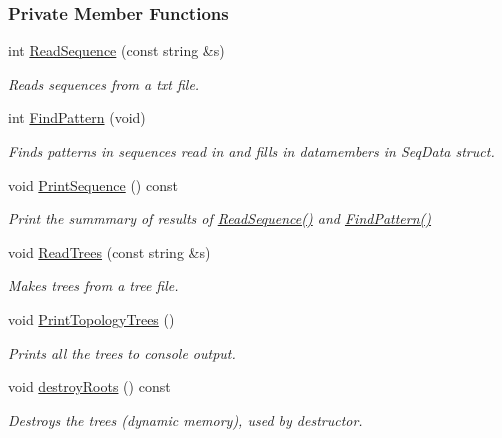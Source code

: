\subsubsection*{\-Private \-Member \-Functions}
\begin{DoxyCompactItemize}
\item 
int \hyperlink{classFPhyloPOT_a02e78c307455acbbaa53b0482d4a8b0c}{\-Read\-Sequence} (const string \&s)
\begin{DoxyCompactList}\small\item\em \-Reads sequences from a txt file. \end{DoxyCompactList}\item 
int \hyperlink{classFPhyloPOT_a7fbfb801cd7d80b8148500c9f0b07216}{\-Find\-Pattern} (void)
\begin{DoxyCompactList}\small\item\em \-Finds patterns in sequences read in and fills in datamembers in \-Seq\-Data struct. \end{DoxyCompactList}\item 
void \hyperlink{classFPhyloPOT_a7c075a1b4511f691106e7c5c823a5e78}{\-Print\-Sequence} () const 
\begin{DoxyCompactList}\small\item\em \-Print the summmary of results of \hyperlink{classFPhyloPOT_a02e78c307455acbbaa53b0482d4a8b0c}{\-Read\-Sequence()} and \hyperlink{classFPhyloPOT_a7fbfb801cd7d80b8148500c9f0b07216}{\-Find\-Pattern()} \end{DoxyCompactList}\item 
void \hyperlink{classFPhyloPOT_a7c1b63e0429cce2c72eaabf284eb5e43}{\-Read\-Trees} (const string \&s)
\begin{DoxyCompactList}\small\item\em \-Makes trees from a tree file. \end{DoxyCompactList}\item 
void \hyperlink{classFPhyloPOT_aaa8c6c8230611cf1f7029be0d00e352c}{\-Print\-Topology\-Trees} ()
\begin{DoxyCompactList}\small\item\em \-Prints all the trees to console output. \end{DoxyCompactList}\item 
void \hyperlink{classFPhyloPOT_ac126a3c0fbba14c07054ef35c9b6e858}{destroy\-Roots} () const 
\begin{DoxyCompactList}\small\item\em \-Destroys the trees (dynamic memory), used by destructor. \end{DoxyCompactList}\end{DoxyCompactItemize}
